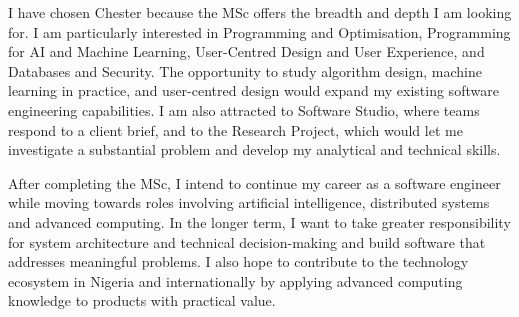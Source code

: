\documentclass[11pt,a4paper]{article}
\begin{document}
I have chosen Chester because the MSc offers the breadth and depth I am looking for. I am particularly interested in Programming and Optimisation, Programming for AI and Machine Learning, User-Centred Design and User Experience, and Databases and Security. The opportunity to study algorithm design, machine learning in practice, and user-centred design would expand my existing software engineering capabilities. I am also attracted to Software Studio, where teams respond to a client brief, and to the Research Project, which would let me investigate a substantial problem and develop my analytical and technical skills.

After completing the MSc, I intend to continue my career as a software engineer while moving towards roles involving artificial intelligence, distributed systems and advanced computing. In the longer term, I want to take greater responsibility for system architecture and technical decision-making and build software that addresses meaningful problems. I also hope to contribute to the technology ecosystem in Nigeria and internationally by applying advanced computing knowledge to products with practical value.
\end{document}
